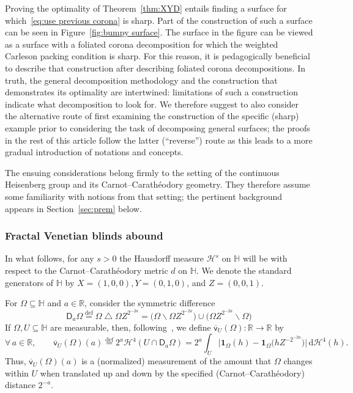 \documentclass[11pt,reqno]{amsart}
\renewcommand{\H}{\mathbb{H}}
\newcommand{\R}{\mathbb{R}}
\newcommand{\cH}{\mathcal{H}}
\newcommand{\ud}[0]{\,\mathrm{d}}
\newcommand{\0}{\mathbf{0}}
\renewcommand{\1}{\mathbf 1}
\newcommand{\from}{\colon}
\newcommand{\symdiff}{\mathbin{\triangle}}
\renewcommand{\subset}{\subseteq}
\newcommand{\eqdef}{\stackrel{\mathrm{def}}{=}}
\renewcommand{\setminus}{\smallsetminus}
\theoremstyle{remark}
\newcommand{\vpfl}[1]{{\overline{\mathsf{v}}_{\!#1}}}
\begin{document}
Proving the optimality of Theorem~\ref{thm:XYD} entails finding a surface for which~\eqref{eq:use previous corona} is sharp.  Part of the construction of such a surface can be seen in Figure~\ref{fig:bumpy surface}.  The surface in the figure can be viewed as a surface with a foliated corona decomposition for which the weighted Carleson packing condition is sharp.  For this reason, it is pedagogically beneficial to describe that  construction after describing foliated corona decompositions. In truth, the general decomposition methodology and the construction that demonstrates its optimality are intertwined:  limitations of such a construction indicate what decomposition to look for.  We therefore suggest to also consider the alternative route of first examining the construction of the specific (sharp) example prior to considering the task of decomposing general surfaces; the proofs in the rest of this article follow the latter (``reverse'') route as this leads to a more gradual introduction of notations and concepts.

The ensuing considerations belong firmly to the setting of the continuous Heisenberg group and its Carnot--Carath\'eodory geometry. They therefore assume some familiarity with notions from that setting; the pertinent background appears in Section~\ref{sec:prem} below.

\subsubsection{Fractal Venetian blinds abound}\label{sec:corona intro} In what follows, for any $s>0$ the  Hausdorff measure $\cH^s$ on $\H$ will be with respect to the Carnot--Carath\'eodory metric $d$ on $\H$. We denote the standard generators of $\H$ by $X=(1,0,0), Y=(0,1,0)$, and $Z=(0,0,1)$.

For $\Omega\subset \H$ and $a\in \R$, consider the symmetric difference
\begin{equation}\label{eq:def D set}
  \mathsf{D}_a\Omega\eqdef  \Omega \symdiff \Omega Z^{2^{-2a}}= \bigl(\Omega\setminus \Omega Z^{2^{-2a}}\bigr) \cup \bigl(\Omega Z^{2^{-2a}}\setminus \Omega\bigr)
\end{equation}
If $\Omega,U\subset \H$ are measurable, then, following~\cite{LafforgueNaor,NY18}, we define  $\vpfl{U}(\Omega)\from \R\to \R$ by
\begin{equation}\label{eq:def vert per}
\forall\, a\in \R,\qquad \vpfl{U}(\Omega)(a)\eqdef 2^a \cH^4\left(U\cap \mathsf{D}_a\Omega\right)=2^a\int_U\big|\1_\Omega(h)-\1_\Omega\bigl(hZ^{-2^{-2a}}\bigr)\big|\ud\cH^4(h).
\end{equation}
Thus, $\vpfl{U}(\Omega)(a)$ is a (normalized) measurement of the amount that $\Omega$ changes within $U$ when translated up and down by the specified (Carnot--Carath\'eodory) distance $2^{-a}$.
\end{document}
